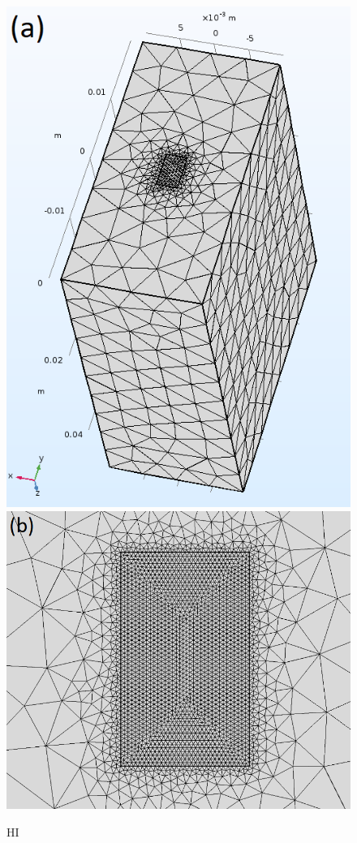 \documentclass[preprint]{iucr}              %
\begin{document}
\begin{figure}
\caption{HI}
\includegraphics{images/bare_silicon.png}
\includegraphics{images/incidence_mesh.png}
\label{fig:bare_silicon}
\end{figure}
\end{document}

